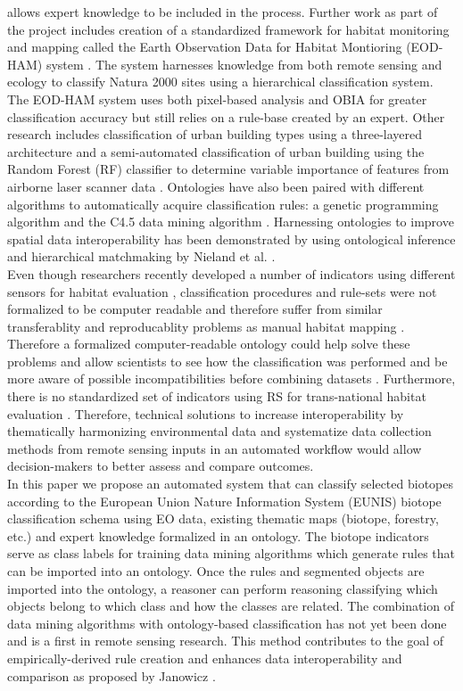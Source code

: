 \documentclass[authoryear, review,12pt,number]{elsarticle}
\begin{document}
allows expert knowledge to be included in the process. Further work as part of
the project includes creation of a standardized
framework for habitat monitoring and mapping called the Earth Observation Data
for Habitat Montioring (EOD-HAM) system \citep{Lucas2015}. The system harnesses
knowledge from both remote sensing and ecology to classify Natura 2000 sites
using a hierarchical classification system. The EOD-HAM system uses both
pixel-based analysis and OBIA for greater classification accuracy but still
relies on a rule-base created by an expert. Other research includes
classification of urban building types using a three-layered architecture
\citep{diSciascio2013} and a semi-automated classification of urban building
using the Random Forest (RF) classifier to determine variable importance of
features from airborne laser scanner data \citep{Belgiu2014}. Ontologies have
also been paired with different algorithms to automatically acquire
classification rules: a genetic programming algorithm
\citep{Forestier2012470} and the C4.5 data mining algorithm
\citep{Sheeren2006ML}. Harnessing ontologies to improve spatial data
interoperability has been demonstrated by using ontological inference and
hierarchical matchmaking by Nieland et al. \citep{Nieland2015}. 
\\
Even though researchers recently developed a number of indicators using
different sensors for habitat evaluation \citep{Nagendra2013}, classification
procedures and rule-sets were not formalized to be computer readable and
therefore suffer from similar transferablity and reproducablity problems as
manual habitat mapping \citep{Arvor2013, Nieland2015}.
Therefore a formalized computer-readable ontology could help solve these
problems and allow scientists to see how the classification was performed and be
more aware of possible incompatibilities before combining datasets
\citep{Janowicz2012}. 
Furthermore, there is no standardized set of indicators
using RS for trans-national habitat evaluation \citep{Lucas2015}. Therefore,
technical solutions to increase interoperability by thematically harmonizing
environmental data and systematize data collection methods from remote sensing
inputs in an automated workflow would allow decision-makers to better assess and
compare outcomes.
\\
In this paper we propose an automated system that can
classify selected biotopes according to the European Union Nature Information
System (EUNIS) biotope classification schema using EO data, existing
thematic maps (biotope, forestry, etc.) and expert knowledge formalized in an
ontology. The biotope indicators serve as class labels for training data mining
algorithms which generate rules that can be imported into an ontology. Once the
rules and segmented objects are imported into the ontology, a reasoner can
perform reasoning classifying which objects belong to which class and how the
classes are related. The combination of data mining algorithms with
ontology-based classification has not yet been done and is a first in remote
sensing research. This method contributes to the goal of empirically-derived
rule creation and enhances data interoperability and comparison as proposed by
Janowicz \citep{Janowicz2012}.
\end{document}
